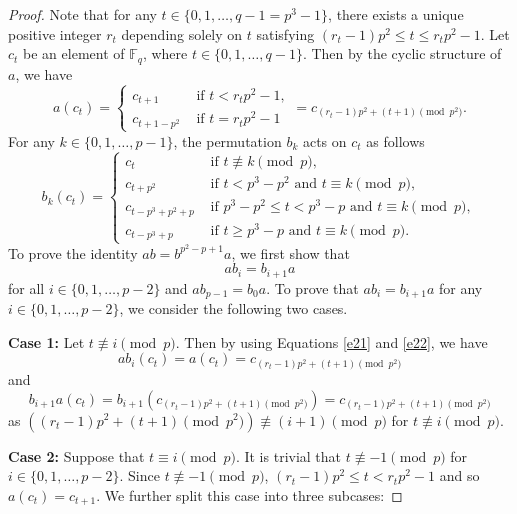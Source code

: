 \documentclass[11pt]{amsart}
\theoremstyle{plain}
\numberwithin{equation}{section}
\def\F{{\mathbb F}}
\begin{document}
 \begin{proof}
 Note that for any $t \in \{0,1,\ldots,q-1=p^3-1\}$, there exists a unique positive integer $r_t$ depending solely on $t$ satisfying $ (r_t-1)p^{2} \leq t \leq r_tp^{2}-1$. Let $c_t$ be an element of $\F_q$, where $t \in \{0,1,\ldots,q-1\}$. Then by the cyclic structure of $a$, we have
 \begin{equation}\label{e21}
a(c_{t})=\begin{cases}

       c_{t+1} & \text{ if } t < r_tp^{2}-1, \\
       c_{t+1-p^2} & \text{ if } t=r_tp^{2}-1
       	\end{cases}
=c_{(r_t-1)p^{2}+(t+1)\pmod {p^{2}}}.
\end{equation}
For any $k \in \{0,1,\ldots,p-1\}$, the permutation $b_k$ acts on $c_t$ as follows 
\begin{equation}\label{e22}
b_k(c_{t})=\begin{cases}
       c_{t} & \text{ if } t \not \equiv k  \pmod  p, \\
       c_{t+p^2} & \text{ if } t < p^{3}-p^2 \text{ and } t \equiv k  \pmod  p, \\
       c_{t-p^3+p^2+p} & \text{ if } p^{3}-p^2 \leq  t < p^{3}-p \text{ and } t \equiv k  \pmod  p,\\
       c_{t-p^3+p} & \text{ if }    t \geq p^{3}-p \text{ and } t \equiv k \pmod  p.
       	\end{cases}
\end{equation}
To prove the identity $ab=b^{p^2-p+1}a$, we first show that $$ab_i=b_{i+1}a$$ for all $ i \in \{0,1,\ldots,p-2\}$ and $ab_{p-1}=b_0a$. To prove that $ab_i=b_{i+1}a$ for any $i \in \{0,1,\ldots,p-2\}$, we consider the following two cases.


\textbf{Case 1:} Let $t \not \equiv i \pmod  p$. Then by using Equations \eqref{e21} and \eqref{e22}, we have
\[
ab_i(c_t)=a(c_t)=c_{(r_t-1)p^2+(t+1) \pmod {p^2}}
\]
and
\[
b_{i+1}a(c_t)=b_{i+1}(c_{(r_t-1)p^2+(t+1) \pmod {p^2}})=c_{(r_t-1)p^2+(t+1) \pmod {p^2}}
\]
as $((r_t-1)p^2+(t+1) \pmod {p^2} )\not \equiv (i+1) \pmod p$ for  $t \not \equiv i  \pmod p$. 

\textbf{Case 2:} Suppose that $t \equiv i \pmod  p$. It is trivial that $t \not \equiv -1 \pmod  p$ for $i \in \{0,1,\ldots,p-2\}$. Since $t \not \equiv -1 \pmod  p$, $ (r_t-1)p^{2} \leq t < r_tp^{2}-1$ and so $a(c_t)=c_{t+1}$.  We further split this case into three subcases:


\end{proof}
\end{document}
